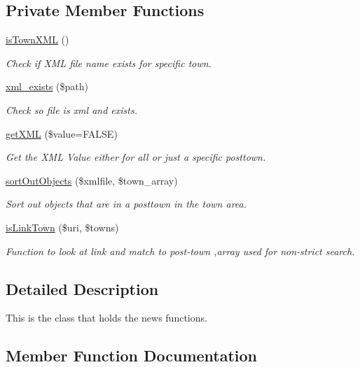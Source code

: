 \subsection*{Private Member Functions}
\begin{DoxyCompactItemize}
\item 
\hyperlink{class_news_a1b0fb404a16f7b85f85b67eb05238b69}{is\+Town\+X\+ML} ()
\begin{DoxyCompactList}\small\item\em Check if X\+ML file name exists for specific town. \end{DoxyCompactList}\item 
\hyperlink{class_news_ad6eee22d2271aa0873387099a6a4c4c8}{xml\+\_\+exists} (\$path)
\begin{DoxyCompactList}\small\item\em Check so file is xml and exists. \end{DoxyCompactList}\item 
\hyperlink{class_news_aa9f1517421b0c0ecaeb992a00c3c37a8}{get\+X\+ML} (\$value=F\+A\+L\+SE)
\begin{DoxyCompactList}\small\item\em Get the X\+ML Value either for all or just a specific posttown. \end{DoxyCompactList}\item 
\hyperlink{class_news_a6b9d6856e5a51474160b2869ee690902}{sort\+Out\+Objects} (\$xmlfile, \$town\+\_\+array)
\begin{DoxyCompactList}\small\item\em Sort out objects that are in a posttown in the town area. \end{DoxyCompactList}\item 
\hyperlink{class_news_a002eef91ca7d8590faf45d61b84539c0}{is\+Link\+Town} (\$uri, \$towns)
\begin{DoxyCompactList}\small\item\em Function to look at link and match to post-\/town ,array used for non-\/strict search. \end{DoxyCompactList}\end{DoxyCompactItemize}


\subsection{Detailed Description}
This is the class that holds the news functions. 

\subsection{Member Function Documentation}
\hypertarget{class_news_ae09b063136b3d937ff18a3fbf59a1110}{}\label{class_news_ae09b063136b3d937ff18a3fbf59a1110} 
